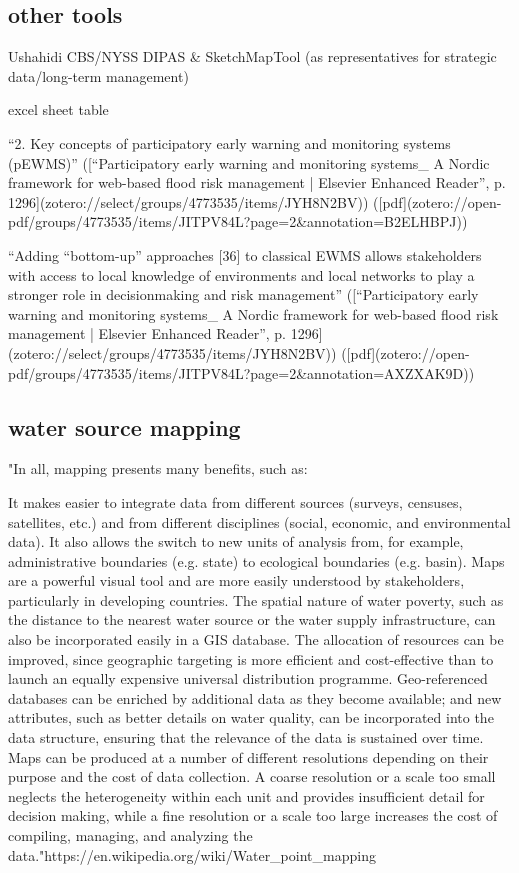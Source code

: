 {%

\subsection{other tools}
Ushahidi
CBS/NYSS
DIPAS \& SketchMapTool (as representatives for strategic data/long-term management)

excel sheet table

“2. Key concepts of participatory early warning and monitoring systems (pEWMS)” ([“Participatory early warning and monitoring systems_ A Nordic framework for web-based flood risk management | Elsevier Enhanced Reader”, p. 1296](zotero://select/groups/4773535/items/JYH8N2BV)) ([pdf](zotero://open-pdf/groups/4773535/items/JITPV84L?page=2&annotation=B2ELHBPJ))

“Adding “bottom-up” approaches [36] to classical EWMS allows stakeholders with access to local knowledge of environments and local networks to play a stronger role in decisionmaking and risk management” ([“Participatory early warning and monitoring systems_ A Nordic framework for web-based flood risk management | Elsevier Enhanced Reader”, p. 1296](zotero://select/groups/4773535/items/JYH8N2BV)) ([pdf](zotero://open-pdf/groups/4773535/items/JITPV84L?page=2&annotation=AXZXAK9D))

\subsection{water source mapping}
"In all, mapping presents many benefits, such as:

It makes easier to integrate data from different sources (surveys, censuses, satellites, etc.) and from different disciplines (social, economic, and environmental data). It also allows the switch to new units of analysis from, for example, administrative boundaries (e.g. state) to ecological boundaries (e.g. basin).
Maps are a powerful visual tool and are more easily understood by stakeholders, particularly in developing countries.
The spatial nature of water poverty, such as the distance to the nearest water source or the water supply infrastructure, can also be incorporated easily in a GIS database.
The allocation of resources can be improved, since geographic targeting is more efficient and cost-effective than to launch an equally expensive universal distribution programme.
Geo-referenced databases can be enriched by additional data as they become available; and new attributes, such as better details on water quality, can be incorporated into the data structure, ensuring that the relevance of the data is sustained over time.
Maps can be produced at a number of different resolutions depending on their purpose and the cost of data collection. A coarse resolution or a scale too small neglects the heterogeneity within each unit and provides insufficient detail for decision making, while a fine resolution or a scale too large increases the cost of compiling, managing, and analyzing the data."https://en.wikipedia.org/wiki/Water_point_mapping

}
